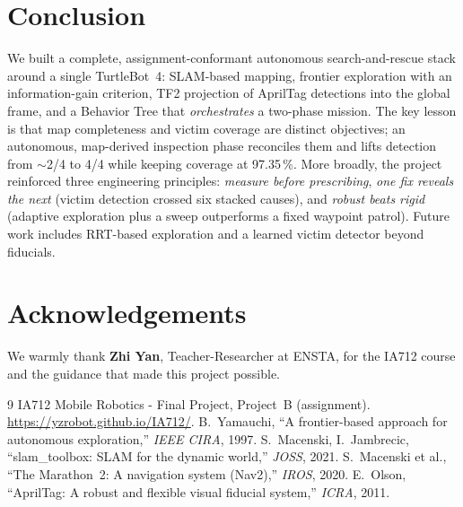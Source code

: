 \documentclass[10pt,twocolumn,a4paper]{article}
\begin{document}
\section{Conclusion}
We built a complete, assignment-conformant autonomous search-and-rescue stack around a single
TurtleBot~4: SLAM-based mapping, frontier exploration with an information-gain criterion, TF2 projection
of AprilTag detections into the global frame, and a Behavior Tree that \emph{orchestrates} a two-phase
mission. The key lesson is that map completeness and victim coverage are distinct objectives; an
autonomous, map-derived inspection phase reconciles them and lifts detection from $\sim$2/4 to 4/4 while
keeping coverage at 97.35\,\%. More broadly, the project reinforced three engineering principles:
\emph{measure before prescribing}, \emph{one fix reveals the next} (victim detection crossed six stacked
causes), and \emph{robust beats rigid} (adaptive exploration plus a sweep outperforms a fixed waypoint
patrol). Future work includes RRT-based exploration and a learned victim detector beyond fiducials.

\section*{Acknowledgements}
We warmly thank \textbf{Zhi Yan}, Teacher-Researcher at ENSTA, for the IA712 course and the guidance that
made this project possible.

\begingroup
\scriptsize
\begin{thebibliography}{9}
\setlength{\itemsep}{0pt}
\setlength{\parskip}{0pt}
 IA712 Mobile Robotics - Final Project, Project~B (assignment). \url{https://yzrobot.github.io/IA712/}.
 B.~Yamauchi, ``A frontier-based approach for autonomous exploration,'' \emph{IEEE CIRA}, 1997.
 S.~Macenski, I.~Jambrecic, ``slam\_toolbox: SLAM for the dynamic world,'' \emph{JOSS}, 2021.
 S.~Macenski et al., ``The Marathon~2: A navigation system (Nav2),'' \emph{IROS}, 2020.
 E.~Olson, ``AprilTag: A robust and flexible visual fiducial system,'' \emph{ICRA}, 2011.
\end{thebibliography}
\endgroup
\end{document}
